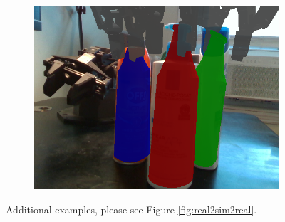 \documentclass{article}
\begin{document}
\begin{figure}[]
\begin{subfigure}{(\linewidth - 0.05\linewidth)/5}
        \includegraphics[width=\linewidth]{figures/real2sim2real/8/4.png}
        \caption{}
    \end{subfigure}

    \caption{Additional examples, please see Figure \ref{fig:real2sim2real}.}
    \label{fig:real2sim2real_part2}
\end{figure}
\end{document}
